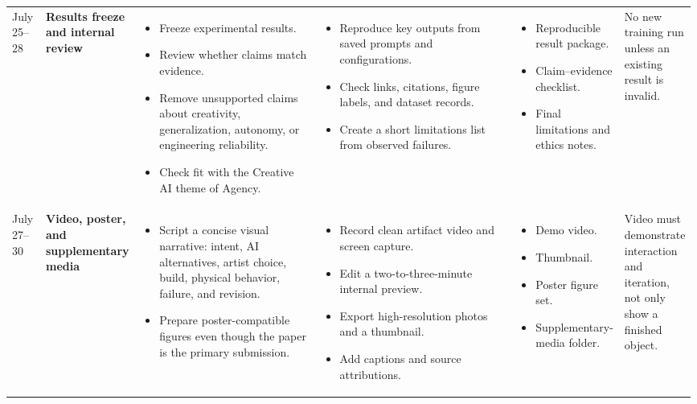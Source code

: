 \documentclass{article}
\begin{document}
\begin{landscape}
\begin{longtable}{
    L{0.05\linewidth}
    L{0.08\linewidth}
    L{0.3\linewidth}
    L{0.33\linewidth}
    L{0.15\linewidth}
    L{0.08\linewidth}
}
July 25--28
&
\textbf{Results freeze and internal review}
&
\begin{itemize}[leftmargin=*,nosep]
    \item Freeze experimental results.
    \item Review whether claims match evidence.
    \item Remove unsupported claims about creativity,
    generalization, autonomy, or engineering reliability.
    \item Check fit with the Creative AI theme of Agency.
\end{itemize}
&
\begin{itemize}[leftmargin=*,nosep]
    \item Reproduce key outputs from saved prompts and configurations.
    \item Check links, citations, figure labels, and dataset records.
    \item Create a short limitations list from observed failures.
\end{itemize}
&
\begin{itemize}[leftmargin=*,nosep]
    \item Reproducible result package.
    \item Claim--evidence checklist.
    \item Final limitations and ethics notes.
\end{itemize}
&
No new training run unless an existing result is invalid.
\\

July 27--30
&
\textbf{Video, poster, and supplementary media}
&
\begin{itemize}[leftmargin=*,nosep]
    \item Script a concise visual narrative:
    intent, AI alternatives, artist choice, build,
    physical behavior, failure, and revision.
    \item Prepare poster-compatible figures even though the paper is
    the primary submission.
\end{itemize}
&
\begin{itemize}[leftmargin=*,nosep]
    \item Record clean artifact video and screen capture.
    \item Edit a two-to-three-minute internal preview.
    \item Export high-resolution photos and a thumbnail.
    \item Add captions and source attributions.
\end{itemize}
&
\begin{itemize}[leftmargin=*,nosep]
    \item Demo video.
    \item Thumbnail.
    \item Poster figure set.
    \item Supplementary-media folder.
\end{itemize}
&
Video must demonstrate interaction and iteration,
not only show a finished object.
\\


\end{longtable}
\end{landscape}
\end{document}
